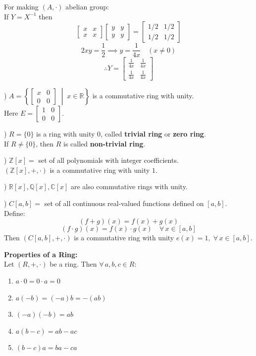 \documentclass[11pt]{article}
\begin{document}
\noindent For making $(A, \cdot)$ abelian group: \\
If $Y = X^{-1}$ then
\[
\begin{bmatrix} x & x \\ x & x \end{bmatrix} \begin{bmatrix} y & y \\ y & y \end{bmatrix} = \begin{bmatrix} 1/2 & 1/2 \\ 1/2 & 1/2 \end{bmatrix}
\]
\[
2xy = \frac{1}{2} \implies y = \frac{1}{4x} \quad (x \ne 0)
\]
\[
\therefore Y = \begin{bmatrix} \frac{1}{4x} & \frac{1}{4x} \\ \frac{1}{4x} & \frac{1}{4x} \end{bmatrix}
\]

\newpage
) $A = \left\{ \begin{bmatrix} x & 0 \\ 0 & 0 \end{bmatrix} \;\middle|\; x \in \mathbb{R} \right\}$ is a commutative ring with unity. \\
Here $E = \begin{bmatrix} 1 & 0 \\ 0 & 0 \end{bmatrix}$.

\bigskip
{}) $R = \{0\}$ is a ring with unity $0$, called \textbf{trivial ring} or \textbf{zero ring}. \\
If $R \ne \{0\}$, then $R$ is called \textbf{non-trivial ring}.

\bigskip
{}) $\mathbb{Z}[x] =$ set of all polynomials with integer coefficients. \\
$(\mathbb{Z}[x], +, \cdot)$ is a commutative ring with unity $1$.

\bigskip
{}) $\mathbb{R}[x], \mathbb{Q}[x], \mathbb{C}[x]$ are also commutative rings with unity.

\bigskip
{}) $C[a, b] =$ set of all continuous real-valued functions defined on $[a, b]$. \\
Define:
\[
(f + g)(x) = f(x) + g(x)
\]
\[
(f \cdot g)(x) = f(x) \cdot g(x) \quad \forall\, x \in [a, b]
\]
Then $(C[a, b], +, \cdot)$ is a commutative ring with unity $e(x) = 1, \; \forall\, x \in [a, b]$.

\bigskip
\noindent \textbf{Properties of a Ring:} \\
Let $(R, +, \cdot)$ be a ring. Then $\forall\, a, b, c \in R$:
\begin{enumerate}
    \item $a \cdot 0 = 0 \cdot a = 0$
    \item $a(-b) = (-a)b = -(ab)$
    \item $(-a)(-b) = ab$
    \item $a(b - c) = ab - ac$
    \item $(b - c)a = ba - ca$
\end{enumerate}
\end{document}
